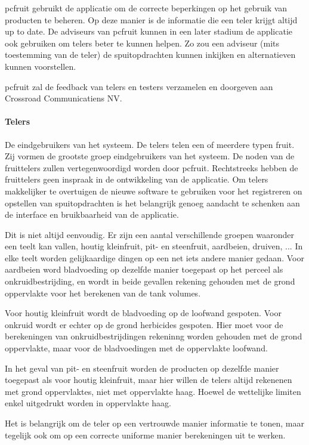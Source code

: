 pcfruit gebruikt de applicatie om de correcte beperkingen op het gebruik van
producten te beheren. Op deze manier is de informatie die een teler krijgt altijd up to
date. De adviseurs van pcfruit kunnen in een later stadium de applicatie ook gebruiken om
telers beter te kunnen helpen. Zo zou een adviseur (mits toestemming van de teler) de
spuitopdrachten kunnen inkijken en alternatieven kunnen voorstellen.

pcfruit zal de feedback van telers en testers verzamelen en doorgeven aan Crossroad
Communicatiens NV.

\paragraph {Telers} De eindgebruikers van het systeem. De telers telen een of meerdere
typen fruit. Zij vormen de grootste groep eindgebruikers van het systeem. De noden van de
fruittelers zullen vertegenwoordigd worden door pcfruit. Rechtstreeks hebben de
fruittelers geen inspraak in de ontwikkeling van de applicatie. Om telers makkelijker te
overtuigen de nieuwe software te gebruiken voor het registreren on opstellen van
spuitopdrachten is het belangrijk genoeg aandacht te schenken aan de interface en
bruikbaarheid van de applicatie.

Dit is niet altijd eenvoudig. Er zijn een aantal verschillende groepen waaronder een teelt
kan vallen, houtig kleinfruit, pit- en steenfruit, aardbeien, druiven, ... In elke teelt
worden gelijkaardige dingen op een net iets andere manier gedaan. Voor aardbeien word
bladvoeding op dezelfde manier toegepast op het perceel als onkruidbestrijding, en wordt
in beide gevallen rekening gehouden met de grond oppervlakte voor het berekenen van de
tank volumes.

Voor houtig kleinfruit wordt de bladvoeding op de loofwand gespoten. Voor
onkruid wordt er echter op de grond herbicides gespoten. Hier moet voor de berekeningen
van onkruidbestrijdingen rekeninng worden gehouden met de grond oppervlakte, maar voor de
bladvoedingen met de oppervlakte loofwand.

In het geval van pit- en steenfruit worden de producten op dezelfde manier toegepast als
voor houtig kleinfruit, maar hier willen de telers altijd rekenenen met grond
oppervlaktes, niet met oppervlakte haag. Hoewel de wettelijke limiten enkel uitgedrukt
worden in oppervlakte haag.

Het is belangrijk om de teler op een vertrouwde manier informatie te tonen, maar tegelijk
ook om op een correcte uniforme manier berekeningen uit te werken.

